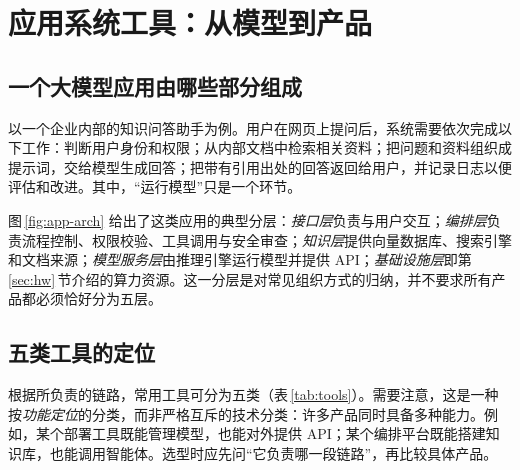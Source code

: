 \section{应用系统工具：从模型到产品}
\label{sec:tools}

\begin{guide}
\begin{minipage}[c]{0.66\linewidth}
\end{minipage}\hfill
\begin{minipage}[c]{0.3\linewidth}\centering{}\end{minipage}
\end{guide}

\subsection{一个大模型应用由哪些部分组成}

以一个企业内部的知识问答助手为例。用户在网页上提问后，系统需要依次完成以下工作：判断用户身份和权限；从内部文档中检索相关资料；把问题和资料组织成提示词，交给模型生成回答；把带有引用出处的回答返回给用户，并记录日志以便评估和改进。其中，“运行模型”只是一个环节。

图\,\ref{fig:app-arch} 给出了这类应用的典型分层：\emph{接口层}负责与用户交互；\emph{编排层}负责流程控制、权限校验、工具调用与安全审查；\emph{知识层}提供向量数据库、搜索引擎和文档来源；\emph{模型服务层}由推理引擎运行模型并提供 API；\emph{基础设施层}即第\,\ref{sec:hw}\,节介绍的算力资源。这一分层是对常见组织方式的归纳，并不要求所有产品都必须恰好分为五层。



\subsection{五类工具的定位}
\label{subsec:tool-types}

根据所负责的链路，常用工具可分为五类（表\,\ref{tab:tools}）。需要注意，这是一种按\emph{功能定位}的分类，而非严格互斥的技术分类：许多产品同时具备多种能力。例如，某个部署工具既能管理模型，也能对外提供 API；某个编排平台既能搭建知识库，也能调用智能体。选型时应先问“它负责哪一段链路”，再比较具体产品。

